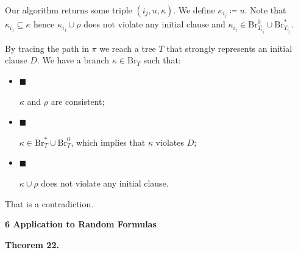 \documentclass[10pt,a4paper]{article}
\begin{document}
Our algorithm returns some triple $(i_{j},u,\kappa)$. We define $\kappa_{i_{j}}\coloneqq u$. Note that $\kappa_{i_{j}}\subseteq\kappa$ hence $\kappa_{i_{j}}\cup\rho$ does not violate any initial
clause and $\kappa_{i_{j}}\in\mathrm{Br}^{0}_{T_{i_{j}}}\cup\mathrm{Br}^{*}_{T_{i_{j}}}$.\par




By tracing the path in $\pi$ we reach a tree $T$ that strongly represents an initial clause $D$. We
have a branch $\kappa\in\mathrm{Br}_{T}$ such that:\par


\begin{itemize}


\item[] 
$\blacksquare$ 


$\kappa$ and $\rho$ are consistent;\par





\item[] 
$\blacksquare$ 


$\kappa\in\mathrm{Br}^{*}_{T}\cup\mathrm{Br}^{0}_{T}$, which implies that $\kappa$ violates $D$;\par





\item[] 
$\blacksquare$ 


$\kappa\cup\rho$ does not violate any initial clause.\par





\end{itemize}


That is a contradiction.\par







\par\medskip\noindent\textbf{
6 Application to Random Formulas}\par





\par\medskip\noindent\textbf{
\textbf{Theorem 22}\textbf{.}
}\par
\end{document}
